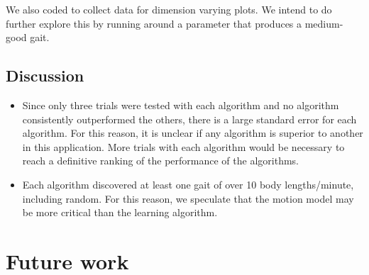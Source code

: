 We also coded  to collect data for dimension
varying plots. We intend to do further explore this by running
 around a parameter that produces a medium-good gait.










\subsection{Discussion}


\begin{itemize}
\item  Since only three trials were tested with each algorithm and no algorithm consistently outperformed the others, there is a large standard error for each algorithm. For this reason, it is unclear if any algorithm is superior to another in this application. More trials with each algorithm would be necessary to reach a definitive ranking of the performance of the algorithms.

\item Each algorithm discovered at least one gait of over 10 body lengths/minute, including random. For this reason, we speculate that the motion model may be more critical than the learning algorithm.
\end{itemize}



\section{Future work}

